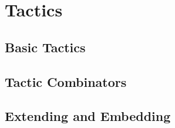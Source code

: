 \section{Tactics}

\subsection{Basic Tactics}

\subsection{Tactic Combinators}

\subsection{Extending and Embedding}